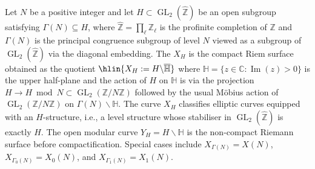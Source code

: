 \begin{definition} \label{definition:X_H_intermediate_modular_curve_parameterizing_elliptic_curves_with_H_structure}
Let $N$ be a positive integer and let $H \subset \operatorname{GL}_2(\widehat{\mathbb{Z}})$ be an open subgroup satisfying $\Gamma(N) \subseteq H$, where $\widehat{\mathbb{Z}} = \prod_{\ell} \mathbb{Z}_\ell$ is the profinite completion of $\mathbb{Z}$ and $\Gamma(N)$ is the principal congruence subgroup of level $N$ viewed as a subgroup of $\operatorname{GL}_2(\widehat{\mathbb{Z}})$ via the diagonal embedding.
The  $X_H$ is the compact Riem surface obtained as the quotient
$\hlin{X_H := H\backslash\overline{\mathbb{H}}}$
where $\mathbb{H} = \{z \in \mathbb{C} : \operatorname{Im}(z) > 0\}$ is the upper half-plane and the action of $H$ on $\mathbb{H}$ is via the projection $H \to H \bmod N \subset \operatorname{GL}_2(\mathbb{Z}/N\mathbb{Z})$ followed by the usual M\"obius action of $\operatorname{GL}_2(\mathbb{Z}/N\mathbb{Z})$ on $\Gamma(N)\backslash\mathbb{H}$.
The curve $X_H$ classifies elliptic curves equipped with an $H$-structure, i.e., a level structure whose stabiliser in $\operatorname{GL}_2(\widehat{\mathbb{Z}})$ is exactly $H$.
The open modular curve $Y_H = H\backslash\mathbb{H}$ is the non-compact Riemann surface before compactification.
Special cases include $X_{\Gamma(N)} = X(N)$, $X_{\Gamma_0(N)} = X_0(N)$, and $X_{\Gamma_1(N)} = X_1(N)$.
\end{definition}

